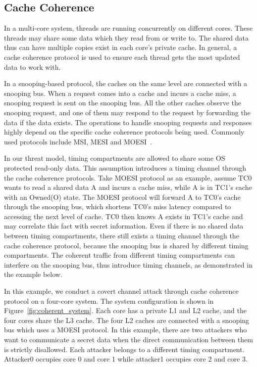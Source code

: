 \subsection{Cache Coherence}
In a multi-core system, threads are running concurrently on different cores. These threads may share some
data which they read from or write to. The shared data thus can have multiple copies exist in each core's
private cache. In general, a cache coherence protocol is used to ensure each thread gets the most updated
data to work with.

In a snooping-based protocol, the caches on the same level are connected with a snooping bus. When a request
comes into a cache and incurs a cache miss, a snooping request is sent on the snooping bus. All the other
caches observe the snooping request, and one of them may respond to the request by forwarding the data if 
the data exists. The operations to handle snooping requests and responses highly depend on the specific cache 
coherence protocols being used. Commonly used protocols include MSI, MESI and MOESI~\cite{mark_book}.

In our threat model, timing compartments are allowed to share some OS protected read-only data. This assumption
introduces a timing channel through the cache coherence protocols. Take MOESI protocol as an example, assume TC0 wants
to read a shared data A and incurs a cache miss, while A is in TC1's cache with an Owned(O) state. The MOESI protocol
will forward A to TC0's cache through the snooping bus, which shortens TC0's miss latency compared to accessing the
next level of cache. TC0 then knows A exists in TC1's cache and may correlate this fact with secret information. 
Even if there is no shared data between timing compartments, there still exists a timing channel through the cache
coherence protocol, because the snooping bus is shared by different timing compartments. 
The coherent traffic from different timing compartments can interfere on the snooping bus, thus introduce timing
channels, as demonstrated in the example below.

In this example, we conduct a covert channel attack through cache coherence protocol on a four-core system. 
The system configuration 
is shown in Figure~\ref{fig:coherent_system}. Each core has a private L1 and L2 cache, and the four cores share
the L3 cache. The four L2 caches are connected with a snooping bus which uses a MOESI protocol. 
In this example, there are two attackers who
want to communicate a secret data when the direct communication between them is strictly disallowed. Each attacker 
belongs to a different timing compartment. Attacker0 occupies core 0 and core 1 while attacker1 occupies core 2 and
core 3. 

